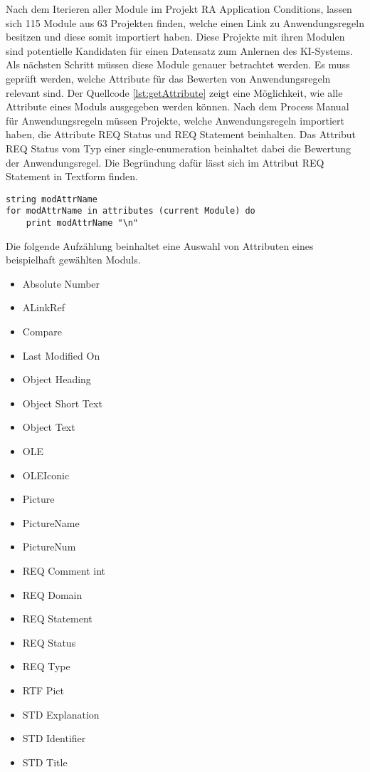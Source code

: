Nach dem Iterieren aller Module im Projekt RA Application Conditions, lassen sich 115 Module aus 63 Projekten finden, welche einen Link zu Anwendungsregeln besitzen und diese somit importiert haben.
Diese Projekte mit ihren Modulen sind potentielle Kandidaten für einen Datensatz zum Anlernen des KI-Systems. Als nächsten Schritt müssen diese Module genauer betrachtet werden. Es muss geprüft werden,
welche Attribute für das Bewerten von Anwendungsregeln relevant sind. Der Quellcode \ref*{lst:getAttribute} zeigt eine Möglichkeit, wie alle Attribute eines Moduls ausgegeben werden können.
Nach dem Process Manual für Anwendungsregeln müssen Projekte, welche Anwendungsregeln importiert haben, die Attribute REQ Status und REQ Statement beinhalten. Das Attribut REQ Status vom Typ einer
single-enumeration beinhaltet dabei die Bewertung der Anwendungsregel. Die Begründung dafür lässt sich im Attribut REQ Statement in Textform finden\cite[S.14]{q2}. 


\begin{lstlisting}[caption={Alle Attribute eines Moduls ausgeben \cite{q9}}, captionpos=b, label = lst:getAttribute] 
string modAttrName
for modAttrName in attributes (current Module) do
    print modAttrName "\n"
\end{lstlisting}

Die folgende Aufzählung beinhaltet eine Auswahl von Attributen eines beispielhaft gewählten Moduls. 

\begin{multicols}{3}
    \begin{itemize}
        \setlength{\itemsep}{0cm}
        \item Absolute Number
        \item ALinkRef
        \item Compare
        \item Last Modified On
        \item Object Heading
        \item Object Short Text
        \item Object Text
        \item OLE
        \item OLEIconic
        \item Picture
        \item PictureName
        \item PictureNum
        \item REQ Comment int
        \item REQ Domain
        \item REQ Statement
        \item REQ Status
        \item REQ Type
        \item RTF Pict
        \item STD Explanation
        \item STD Identifier
        \item STD Title
    \end{itemize}
\end{multicols}

